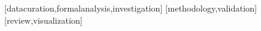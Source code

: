 \documentclass[english]{textolivre}
\begin{document}
\printbibliography\label{sec-bib}


\begin{contributors}
[datacuration,formalanalysis,investigation]
[methodology,validation]
[review,visualization]
\end{contributors}
\end{document}
